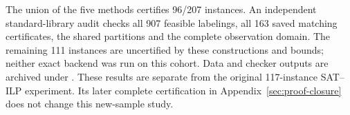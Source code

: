 The union of the five methods certifies 96/207 instances. An independent
standard-library audit checks all 907 feasible labelings, all 163 saved
matching certificates, the shared partitions and the complete observation
domain. The remaining 111 instances are uncertified by these constructions
and bounds; neither exact backend was run on this cohort. Data and checker
outputs are archived under .
These results are separate from the original 117-instance SAT--ILP
experiment. Its later complete certification in
Appendix~\ref{sec:proof-closure} does not change this new-sample study.
\FloatBarrier
